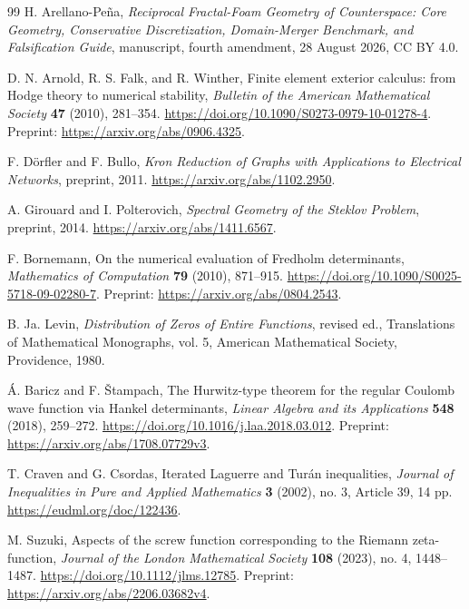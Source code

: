 \documentclass[11pt,letterpaper]{article}
\numberwithin{equation}{section}
\theoremstyle{definition}
\theoremstyle{remark}
\begin{document}
\begin{thebibliography}{99}
H. Arellano-Pe\~na,
\emph{Reciprocal Fractal-Foam Geometry of Counterspace:
Core Geometry, Conservative Discretization, Domain-Merger Benchmark,
and Falsification Guide},
manuscript, fourth amendment, 28 August 2026, CC BY 4.0.

D. N. Arnold, R. S. Falk, and R. Winther,
Finite element exterior calculus: from Hodge theory to numerical stability,
\emph{Bulletin of the American Mathematical Society} \textbf{47} (2010), 281--354.
\url{https://doi.org/10.1090/S0273-0979-10-01278-4}.
Preprint: \url{https://arxiv.org/abs/0906.4325}.

F. D\"orfler and F. Bullo,
\emph{Kron Reduction of Graphs with Applications to Electrical Networks},
preprint, 2011.
\url{https://arxiv.org/abs/1102.2950}.

A. Girouard and I. Polterovich,
\emph{Spectral Geometry of the Steklov Problem},
preprint, 2014.
\url{https://arxiv.org/abs/1411.6567}.

F. Bornemann,
On the numerical evaluation of Fredholm determinants,
\emph{Mathematics of Computation} \textbf{79} (2010), 871--915.
\url{https://doi.org/10.1090/S0025-5718-09-02280-7}.
Preprint: \url{https://arxiv.org/abs/0804.2543}.

B. Ja. Levin,
\emph{Distribution of Zeros of Entire Functions},
revised ed., Translations of Mathematical Monographs, vol. 5,
American Mathematical Society, Providence, 1980.

\'A. Baricz and F. \v{S}tampach,
The Hurwitz-type theorem for the regular Coulomb wave function via Hankel determinants,
\emph{Linear Algebra and its Applications} \textbf{548} (2018), 259--272.
\url{https://doi.org/10.1016/j.laa.2018.03.012}.
Preprint: \url{https://arxiv.org/abs/1708.07729v3}.

T. Craven and G. Csordas,
Iterated Laguerre and Tur\'an inequalities,
\emph{Journal of Inequalities in Pure and Applied Mathematics}
\textbf{3} (2002), no. 3, Article 39, 14 pp.
\url{https://eudml.org/doc/122436}.

M. Suzuki,
Aspects of the screw function corresponding to the Riemann zeta-function,
\emph{Journal of the London Mathematical Society} \textbf{108} (2023), no. 4, 1448--1487.
\url{https://doi.org/10.1112/jlms.12785}.
Preprint: \url{https://arxiv.org/abs/2206.03682v4}.


\end{thebibliography}
\end{document}
